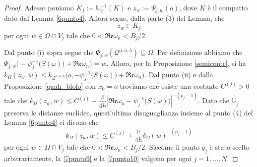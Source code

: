 \begin{proof}
    Adesso poniamo $K_j:=\mathbb{U}_j^{-1}(K)$ e $z_w:=\Psi_{j,w}(o)$, dove $K$ è il compatto dato dal Lemma \ref{6punto4}. Allora segue, dalla parte (3) del Lemma, che
    \begin{equation}\label{7punto9}
        z_w\in K_j
    \end{equation}
    per ogni $w\in\Omega\cap V_j$ tale che $0<\mathfrak{Re}\omega_n<B_j/2$.

    Dal punto (i) sopra segue che $\Psi_{j,w}(\mathcal{Q}^{\alpha,a,h})\subseteq\Omega$. Per definizione abbiamo che $\Psi_{j,w}\Big(-\psi_j^{-1}\big(S(\omega)\big)+\mathfrak{Re}\omega_n\Big)=w$. Allora, per la Proposizione \ref{semicontr}, si ha $k_\Omega(z_w,w)\le k_{\mathcal{Q}^{\alpha,a,h}}\Big(o,-\psi_j^{-1}\big(S(\omega)\big)+\mathfrak{Re}\omega_n\Big)$. Dal punto (ii) e dalla Proposizione \ref{qaah_biolo} con $x_0=o$ troviamo che esiste una costante $C^{(j)}>0$ tale che $k_\Omega(z_w,w)\le C^{(j)}+\dfrac{\pi}{4h}\left|\mathfrak{Re}\omega_n-\psi_j^{-1}\big(S(\omega)\big)\right|^{-(p_j-1)}$. Dato che $\mathbb{U}_j$ preserva le distanze euclidee, quest'ultima disuguaglianza insieme al punto (4) del Lemma \ref{6punto4} ci dicono che
    \begin{equation}\label{7punto10}
        k_\Omega(z_w,w) \le C^{(j)}+\frac{\pi}{4h}\delta_\Omega(w)^{-(p_j-1)}
    \end{equation}
    per ogni $w\in\Omega\cap V_j$ tale che $0<\mathfrak{Re}\omega_n<B_j/2$. Siccome il punto $q_j$ è stato scelto arbitrariamente, la \eqref{7punto9} e la \eqref{7punto10} valgono per ogni $j=1,\dots,N$.


\end{proof}
